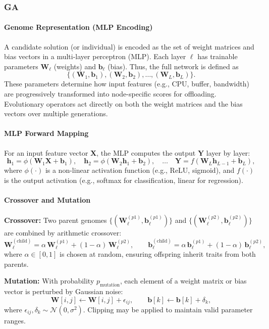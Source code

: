 \documentclass[preprint,3p,authoryear]{elsarticle}
\begin{document}
\subsubsection{GA}


\paragraph{Genome Representation (MLP Encoding)}
A candidate solution (or individual) is encoded as the set of weight matrices and bias vectors in a multi-layer perceptron (MLP). Each layer $\ell$ has trainable parameters $\mathbf{W}_\ell$ (weights) and $\mathbf{b}_\ell$ (bias). Thus, the full network is defined as
\[
\Big\{(\mathbf{W}_1, \mathbf{b}_1), (\mathbf{W}_2, \mathbf{b}_2), \dots, (\mathbf{W}_L, \mathbf{b}_L)\Big\}.
\]
These parameters determine how input features (e.g., CPU, buffer, bandwidth) are progressively transformed into node-specific scores for offloading. Evolutionary operators act directly on both the weight matrices and the bias vectors over multiple generations.

\paragraph{MLP Forward Mapping}
For an input feature vector $\mathbf{X}$, the MLP computes the output $\mathbf{Y}$ layer by layer:
\[
\mathbf{h}_1 = \phi(\mathbf{W}_1 \mathbf{X} + \mathbf{b}_1), \quad
\mathbf{h}_2 = \phi(\mathbf{W}_2 \mathbf{h}_1 + \mathbf{b}_2), \quad \dots \quad
\mathbf{Y} = f(\mathbf{W}_L \mathbf{h}_{L-1} + \mathbf{b}_L),
\]
where $\phi(\cdot)$ is a non-linear activation function (e.g., ReLU, sigmoid), and $f(\cdot)$ is the output activation (e.g., softmax for classification, linear for regression).

\paragraph{Crossover and Mutation}
\textbf{Crossover:} Two parent genomes
\(\{(\mathbf{W}_\ell^{(p1)}, \mathbf{b}_\ell^{(p1)})\}\) 
and 
\(\{(\mathbf{W}_\ell^{(p2)}, \mathbf{b}_\ell^{(p2)})\}\)
are combined by arithmetic crossover:
\[
\mathbf{W}_\ell^{(\text{child})} 
= \alpha\,\mathbf{W}_\ell^{(p1)} 
+ (1-\alpha)\,\mathbf{W}_\ell^{(p2)}, \qquad
\mathbf{b}_\ell^{(\text{child})} 
= \alpha\,\mathbf{b}_\ell^{(p1)} 
+ (1-\alpha)\,\mathbf{b}_\ell^{(p2)},
\]
where $\alpha \in [0,1]$ is chosen at random, ensuring offspring inherit traits from both parents.

\textbf{Mutation:} With probability $p_{\text{mutation}}$, each element of a weight matrix or bias vector is perturbed by Gaussian noise:
\[
\mathbf{W}[i,j] \leftarrow \mathbf{W}[i,j] + \epsilon_{ij}, 
\qquad 
\mathbf{b}[k] \leftarrow \mathbf{b}[k] + \delta_{k},
\]
where $\epsilon_{ij}, \delta_k \sim \mathcal{N}(0,\sigma^2)$. Clipping may be applied to maintain valid parameter ranges.
\end{document}
